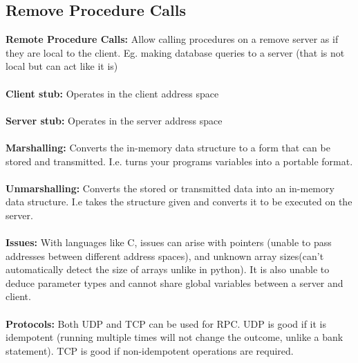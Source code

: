 \documentclass[a4paper,10pt]{article}
\begin{document}
\subsection{Remove Procedure Calls}
\textcolor{PineGreen}{\textbf{Remote Procedure Calls:}} Allow calling procedures on a remove server as if they are local to the client. Eg. making database queries to a server (that is not local but can act like it is) \\\\
\textcolor{PineGreen}{\textbf{Client stub:}} Operates in the client address space \\\\
\textcolor{PineGreen}{\textbf{Server stub:}} Operates in the server address space \\\\
\textcolor{PineGreen}{\textbf{Marshalling:}} Converts the in-memory data structure to a form that can be stored and transmitted. I.e. turns your programs variables into a portable format. \\\\
\textcolor{PineGreen}{\textbf{Unmarshalling:}} Converts the stored or transmitted data into an in-memory data structure. I.e takes the structure given and converts it to be executed on the server. \\\\
\textcolor{PineGreen}{\textbf{Issues:}} With languages like C, issues can arise with pointers (unable to pass addresses between different address spaces), and unknown array sizes(can't automatically detect the size of arrays unlike in python). It is also unable to deduce parameter types and cannot share global variables between a server and client. \\\\ 
\textcolor{PineGreen}{\textbf{Protocols:}} Both UDP and TCP can be used for RPC. UDP is good if it is idempotent (running multiple times will not change the outcome, unlike a bank statement). TCP is good if non-idempotent operations are required. 
\end{document}
